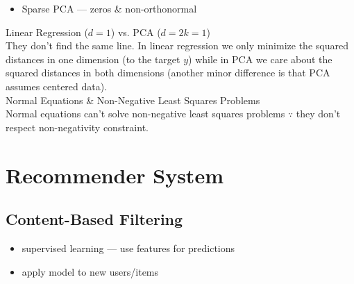 \documentclass[10pt,landscape,a4paper]{article}
\begin{document}
\begin{multicols*}{5}
\begin{itemize}
    \item Sparse PCA --- zeros \& non-orthonormal
\end{itemize}
Linear Regression (\(d=1\)) vs. PCA (\(d=2 k=1\)) \\
They don't find the same line. In linear regression we only minimize the squared distances in one dimension (to the target
\(y\)) while in PCA we care about the squared distances in both dimensions (another minor difference is that PCA assumes centered data). \\
Normal Equations \& Non-Negative Least Squares Problems \\
Normal equations can't solve non-negative least squares problems \(\because \) they don't respect non-negativity constraint.

\section{Recommender System}
\subsection{Content-Based Filtering}
\begin{itemize}
    \item supervised learning --- use features for predictions
    \item apply model to new users/items
\end{itemize}


\end{multicols*}
\end{document}
